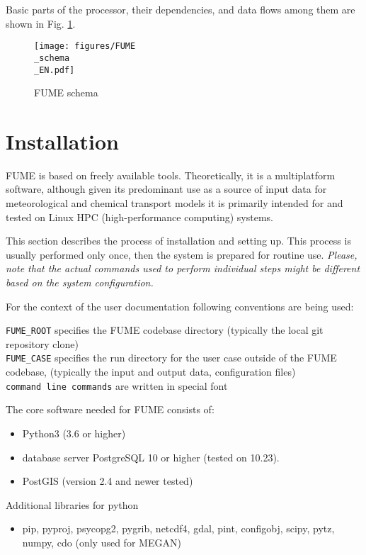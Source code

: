 \documentclass[a4paper,11pt]{article}
\begin{document}
Basic parts of the processor, their dependencies, and data flows among them are shown in Fig. \ref{fig_schema}. 
\begin{figure}[!h]
\centering
\caption{FUME schema}\label{fig_schema}
\texttt{[image: figures/FUME\\\_schema\\\_EN.pdf]}
\end{figure}

\section{Installation}\label{installation}
FUME is based on freely available tools. Theoretically, it is a multiplatform software, although given its predominant use as a source of input data for meteorological and chemical transport models it is primarily intended for and tested on Linux HPC (high-performance computing) systems.

This section describes the process of installation and setting up. This process is usually performed only once, then the system is prepared for routine use. {\em Please, note that the actual commands used to perform individual steps might be different based on the system configuration.}

For the context of the user documentation following conventions are
being used:

\verb|FUME_ROOT| specifies the FUME codebase directory (typically the local
git repository clone) \\ 
\verb|FUME_CASE| specifies the run directory for the
user case outside of the FUME codebase, (typically the input and output data, configuration files) \\
\verb|command line commands| are written in special font 

The core software needed for FUME consists of:
\begin{itemize}
\item
  Python3 (3.6 or higher)
\item
  database server PostgreSQL 10 or higher (tested on 10.23).
\item
  PostGIS (version 2.4 and newer tested)
\end{itemize}

Additional libraries for python
\begin{itemize}
\item
  pip, pyproj, psycopg2, pygrib, netcdf4, gdal, pint, configobj, scipy,
  pytz, numpy, cdo (only used for MEGAN)
\end{itemize}
\end{document}
